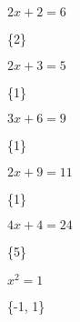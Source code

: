 \documentclass[10pt]{examdesign}
\begin{document}
\begin{shortanswer}[title={Short Answer (1 point each)}, rearrange=no,resetcounter=no,suppressprefix]
    
\begin{question}
	$2 x + 2 = 6$
	\vspace{1cm}
	\begin{answer}
		\{{2}\}
	\end{answer}
\end{question}
\begin{question}
	$2 x + 3 = 5$
	\vspace{1cm}
	\begin{answer}
		\{{1}\}
	\end{answer}
\end{question}
\begin{question}
	$3 x + 6 = 9$
	\vspace{1cm}
	\begin{answer}
		\{{1}\}
	\end{answer}
\end{question}
\begin{question}
	$2 x + 9 = 11$
	\vspace{1cm}
	\begin{answer}
		\{{1}\}
	\end{answer}
\end{question}
\begin{question}
	$4 x + 4 = 24$
	\vspace{1cm}
	\begin{answer}
		\{{5}\}
	\end{answer}
\end{question}
\begin{question}
	$x^{2} = 1$
	\vspace{1cm}
	\begin{answer}
		\{{-1, 1}\}
	\end{answer}
\end{question}
\end{shortanswer}
\end{document}
